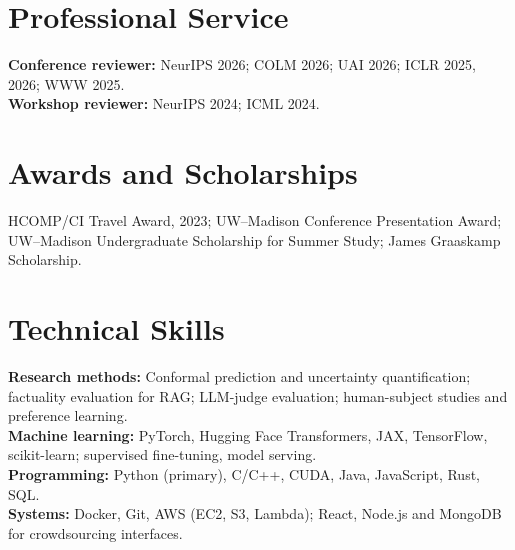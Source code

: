 \documentclass[11pt,letterpaper]{article}
\begin{document}
\section*{Professional Service}
\textbf{Conference reviewer:} NeurIPS 2026; COLM 2026; UAI 2026; ICLR 2025, 2026; WWW 2025.\\
\textbf{Workshop reviewer:} NeurIPS 2024; ICML 2024.

\section*{Awards and Scholarships}
HCOMP/CI Travel Award, 2023; UW--Madison Conference Presentation Award; UW--Madison Undergraduate Scholarship for Summer Study; James Graaskamp Scholarship.

\section*{Technical Skills}
\textbf{Research methods:} Conformal prediction and uncertainty quantification; factuality evaluation for RAG; LLM-judge evaluation; human-subject studies and preference learning.\\
\textbf{Machine learning:} PyTorch, Hugging Face Transformers, JAX, TensorFlow, scikit-learn; supervised fine-tuning, model serving.\\
\textbf{Programming:} Python (primary), C/C++, CUDA, Java, JavaScript, Rust, SQL.\\
\textbf{Systems:} Docker, Git, AWS (EC2, S3, Lambda); React, Node.js and MongoDB for crowdsourcing interfaces.
\end{document}
